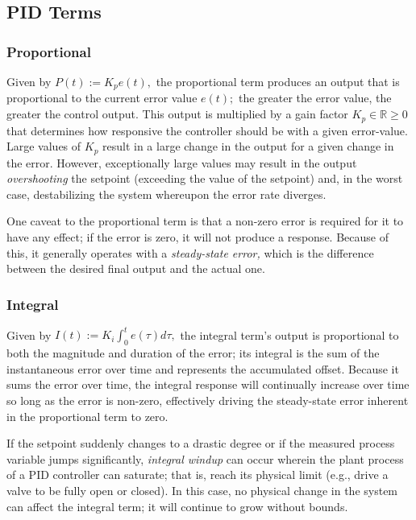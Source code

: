 \documentclass[11pt]{article}
\newcommand{\R}{\mathbb{R}}
\theoremstyle{definition}
\begin{document}
\subsection{PID Terms}

\subsubsection{Proportional}

Given by $P(t) := K_{p}e(t),$ the proportional term produces an output that is proportional to the current error value $e(t);$ the greater
the error value, the greater the control output. This output is multiplied by a gain factor $K_{p} \in \R \geq 0$ that determines how responsive
the controller should be with a given error-value. Large values of $K_{p}$ result in a large change in the output for a given change in the
error. However, exceptionally large values may result in the output \textit{overshooting} the setpoint (exceeding the value of the setpoint)
and, in the worst case, destabilizing the system whereupon the error rate diverges.

One caveat to the proportional term is that a non-zero error is required for it to have any effect; if the error is zero, it will not 
produce a response. Because of this, it generally operates with a \textit{steady-state error,} which is the difference between the desired 
final output and the actual one.

\subsubsection{Integral}

Given by $I(t) := K_{i}\int_{0}^{t}e(\tau)d\tau,$ the integral term's output is proportional to both the magnitude and duration
of the error; its integral is the sum of the instantaneous error over time and represents the accumulated offset. Because it sums
the error over time, the integral response will continually increase over time so long as the error is non-zero, effectively driving
the steady-state error inherent in the proportional term to zero.

If the setpoint suddenly changes to a drastic degree or if the measured process variable jumps significantly, \textit{integral windup}
can occur wherein the plant process of a PID controller can saturate; that is, reach its physical limit (e.g., drive a valve to be fully
open or closed). In this case, no physical change in the system can affect the integral term; it will continue to grow without bounds.
\end{document}
